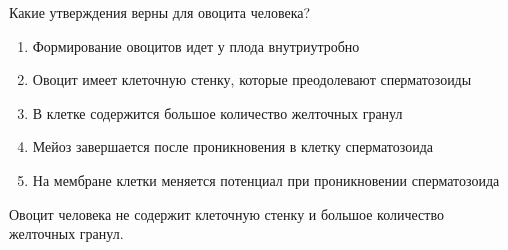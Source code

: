 
Какие утверждения верны для овоцита человека?

\begin{enumerate}
    \item Формирование овоцитов идет у плода внутриутробно
    \item Овоцит имеет клеточную стенку, которые преодолевают сперматозоиды
    \item В клетке содержится большое количество желточных гранул
    \item Мейоз завершается после проникновения в клетку сперматозоида
    \item На мембране клетки меняется потенциал при проникновении сперматозоида
\end{enumerate}

\explanationSection

Овоцит человека не содержит клеточную стенку и большое количество желточных гранул.

